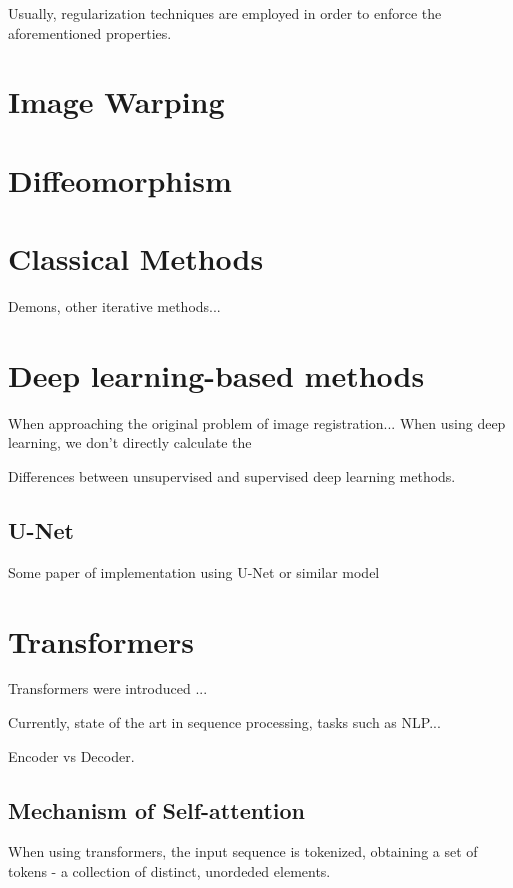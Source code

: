 Usually, regularization techniques are employed in order to enforce the aforementioned properties.

\section{Image Warping}
\label{image-warping}

\section{Diffeomorphism}
\label{Diffeomorphism}

\section{Classical Methods}
\label{classical-methods}
Demons, other iterative methods...

\section{Deep learning-based methods}
\label{deep-learning-methods}
When approaching the original problem of image registration... When using deep learning, we don't directly calculate the 


Differences between unsupervised and supervised deep learning methods.

\subsection{U-Net}
\label{u-net}
Some paper of implementation using U-Net or similar model

\section{Transformers}
\label{transformers}
Transformers were introduced ...

Currently, state of the art in sequence processing, tasks such as NLP...

Encoder vs Decoder.



\subsection{Mechanism of Self-attention}
\label{self-attention}

When using transformers, the input sequence is tokenized, obtaining a set of tokens - a collection of distinct, unordeded elements.


